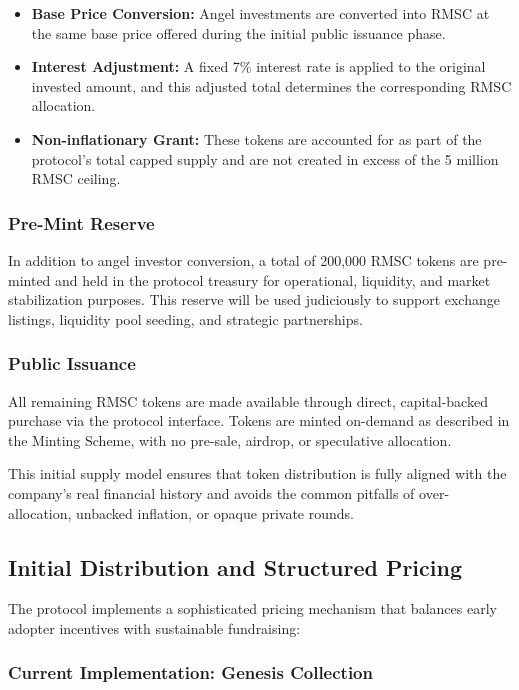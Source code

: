 \documentclass[conference]{IEEEtran}
\begin{document}
\begin{itemize}
    \item \textbf{Base Price Conversion:} Angel investments are converted into RMSC at the same base price offered during the initial public issuance phase.
    \item \textbf{Interest Adjustment:} A fixed 7\% interest rate is applied to the original invested amount, and this adjusted total determines the corresponding RMSC allocation.
    \item \textbf{Non-inflationary Grant:} These tokens are accounted for as part of the protocol's total capped supply and are not created in excess of the 5 million RMSC ceiling.
\end{itemize}

\subsubsection{Pre-Mint Reserve}

In addition to angel investor conversion, a total of 200,000 RMSC tokens are pre-minted and held in the protocol treasury for operational, liquidity, and market stabilization purposes. This reserve will be used judiciously to support exchange listings, liquidity pool seeding, and strategic partnerships.

\subsubsection{Public Issuance}

All remaining RMSC tokens are made available through direct, capital-backed purchase via the protocol interface. Tokens are minted on-demand as described in the Minting Scheme, with no pre-sale, airdrop, or speculative allocation.

This initial supply model ensures that token distribution is fully aligned with the company’s real financial history and avoids the common pitfalls of over-allocation, unbacked inflation, or opaque private rounds.

\subsection{Initial Distribution and Structured Pricing}

The protocol implements a sophisticated pricing mechanism that balances early adopter incentives with sustainable fundraising:

\subsubsection{Current Implementation: Genesis Collection}
\end{document}
